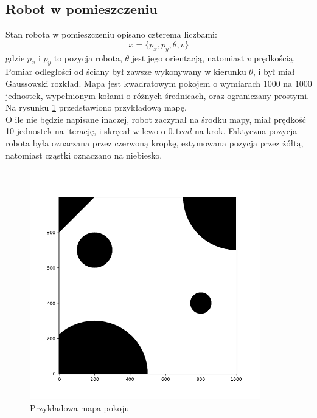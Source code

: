 \subsection{Robot w pomieszczeniu} \label{robot_w_pomieszczeniu_desc}
Stan robota w pomieszczeniu opisano czterema liczbami:
\begin{equation*}
	x = \{p_x,p_y,\theta,v\}
\end{equation*}
gdzie $p_x$ i $p_y$ to pozycja robota, $\theta$ jest jego orientacją, natomiast $v$ prędkością. Pomiar odległości od ściany był zawsze wykonywany w kierunku $\theta$, i był miał Gaussowski rozkład. Mapa jest kwadratowym pokojem o wymiarach $1000$ na $1000$ jednostek, wypełnionym kołami o różnych średnicach, oraz ograniczany prostymi. Na rysunku \ref{przykladowa_mapa_pokoju} przedstawiono przykładową mapę.\\
O ile nie będzie napisane inaczej, robot zaczynał na środku mapy, miał prędkość 10 jednostek na iterację, i skręcał w lewo o $0.1rad$ na krok. Faktyczna pozycja robota była oznaczana przez czerwoną kropkę, estymowana pozycja przez żółtą, natomiast cząstki oznaczano na niebiesko.
\begin{figure}[H]
	\begin{center}
		\includegraphics[width=10cm]{./przykladowa_mapa_pokoju.png}
		\caption{Przykładowa mapa pokoju}
		\label{przykladowa_mapa_pokoju}
	\end{center}
\end{figure}
